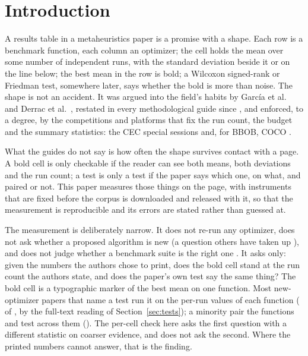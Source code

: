 \documentclass[preprint,review,12pt]{elsarticle}
\begin{document}
\linenumbers

\section{Introduction}
\label{sec:intro}

A results table in a metaheuristics paper is a promise with a shape. Each row is a benchmark function, each column an optimizer; the cell holds the mean over some number of independent runs, with the standard deviation beside it or on the line below; the best mean in the row is bold; a Wilcoxon signed-rank or Friedman test, somewhere later, says whether the bold is more than noise. The shape is not an accident. It was argued into the field's habits by García et al.\ \cite{garcia2009study,garcia2010advanced} and Derrac et al.\ \cite{derrac2011practical}, restated in every methodological guide since \cite{carrasco2020recent,latorre2021prescription,osaba2021tutorial,bartz2020benchmarking,beiranvand2017best,kendall2016good}, and enforced, to a degree, by the competitions and platforms that fix the run count, the budget and the summary statistics: the CEC special sessions and, for BBOB, COCO \cite{hansen2021coco}.

What the guides do not say is how often the shape survives contact with a page. A bold cell is only checkable if the reader can see both means, both deviations and the run count; a test is only a test if the paper says which one, on what, and paired or not. This paper measures those things on the page, with instruments that are fixed before the corpus is downloaded and released with it, so that the measurement is reproducible and its errors are stated rather than guessed at.

The measurement is deliberately narrow. It does not re-run any optimizer, does not ask whether a proposed algorithm is new (a question others have taken up \cite{sorensen2015metaheuristics,aranha2022metaphor,camacho2022exposing,tzanetos2021nature,piotrowski2018some}), and does not judge whether a benchmark suite is the right one \cite{kudela2022critical}. It asks only: given the numbers the authors chose to print, does the bold cell stand at the run count the authors state, and does the paper's own test say the same thing? The bold cell is a typographic marker of the best mean on one function. Most new-optimizer papers that name a test run it on the per-run values of each function (\nTrNewOptimizerOnPerRunValues{} of \nTrNewOptimizerTestNamed{}, by the full-text reading of Section~\ref{sec:tests}); a minority pair the functions and test across them (\nTrNewOptimizerOnPerFunctionMeans{}). The per-cell check here asks the first question with a different statistic on coarser evidence, and does not ask the second. Where the printed numbers cannot answer, that is the finding.
\end{document}
